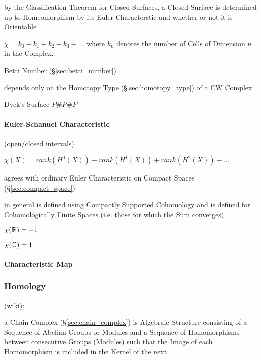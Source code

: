 by the Classification Theorem for Closed Surfaces, a Closed Surface is
determined up to Homeomorphism by its Euler Characterstic and whether or not it
is Orientable

$\chi = k_0 - k_1 + k_2 - k_3 + \ldots$ where $k_n$ denotes the number
of Cells of Dimension $n$ in the Complex.

Betti Number (\S\ref{sec:betti_number})

depends only on the Homotopy Type (\S\ref{sec:homotopy_type}) of a
CW Complex \cite{hatcher02}

Dyck's Surface $P \# P \# P$



\paragraph{Euler-Schanuel Characteristic}\label{sec:euler_schanuel}\hfill

(open/closed intervals) %

$\chi(X) = rank (H^0(X)) - rank (H^1(X)) + rank (H^2(X)) - \ldots$

agrees with ordinary Euler Characteristic on Compact Spaces
(\S\ref{sec:compact_space})

in general is defined using Compactly Supported Cohomology and is
defined for Cohomologically Finite Spaces (i.e. those for which the
Sum converges) %

$\chi(\mathbb{R}) = -1$

$\chi(\mathbb{C}) = 1$



\paragraph{Characteristic Map}\label{sec:characteristic_map}\hfill




\subsubsection{Homology}\label{sec:homology}

(wiki):

a Chain Complex (\S\ref{sec:chain_complex}) is Algebraic Structure consisting
of a Sequence of Abelian Groups or Modules and a Sequence of Homomorphisms
between consecutive Groups (Modules) such that the Image of each Homomorphism
is included in the Kernel of the next

